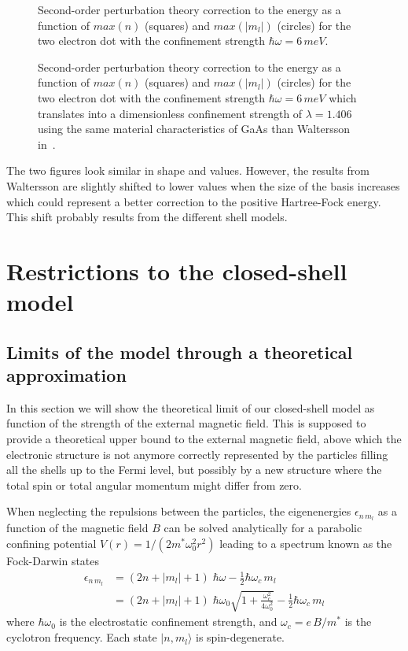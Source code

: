 \begin{figure}
\centering
{}
\caption{\label{fig:waltMBPT} Second-order perturbation theory correction to the energy as a function of $max(n)$ (squares) and $max(|m_l|)$ (circles) for the two electron dot with the confinement strength $\hbar \omega=6 \, meV$.~\cite{Waltersson2007}}
\end{figure}
\begin{figure}
\centering
\scalebox{1}{}
\caption{\label{fig:waltMBPT_repro} Second-order perturbation theory correction to the energy as a function of $max(n)$ (squares) and $max(|m_l|)$ (circles) for the two electron dot with the confinement strength $\hbar \omega=6 \, meV$ which translates into a dimensionless confinement strength of $\lambda=1.406$ using the same material characteristics of GaAs than Waltersson in~\cite{Waltersson2007}.}
\end{figure}
The two figures look similar in shape and values. However, the results from Waltersson are slightly shifted to lower values when the size of the basis increases which could represent a better correction to the positive Hartree-Fock energy. This shift probably results from the different shell models.

\section{Restrictions to the closed-shell model}


\subsection{Limits of the model through a theoretical approximation}
\label{sec:ModelFockDarwin}

In this section we will show the theoretical limit of our closed-shell model as function of the strength of the external magnetic field. This is supposed to provide a theoretical upper bound to the external magnetic field, above which the electronic structure is not anymore correctly represented by the particles filling all the shells up to the Fermi level, but possibly by a new structure where the total spin or total angular momentum might differ from zero.

When neglecting the repulsions between the particles, the eigenenergies $\epsilon_{n \, m_l}$ as a function of the magnetic field $B$ can be solved analytically for a parabolic confining potential $V(r)=1/(2m^*\omega_0^2 r^2)$ leading to a spectrum known as the Fock-Darwin states \cite{Fock1928, Kutzelnigg2003}
\begin{align}
 \epsilon_{n \, m_l} &= (2n+|m_l|+1) \; \hbar \omega - \frac{1}{2}\hbar \omega_c \, m_l\\
&= (2n+|m_l|+1) \; \hbar \omega_0 \sqrt{1+\frac{\omega_c^2}{4\omega_0^2}} -\frac{1}{2}\hbar \omega_c \, m_l
\end{align} 
where $\hbar \omega_0$ is the electrostatic confinement strength, and $\omega_c=e\,B/m^*$ is the cyclotron frequency. Each state $|n,m_l \rangle$ is spin-degenerate.


